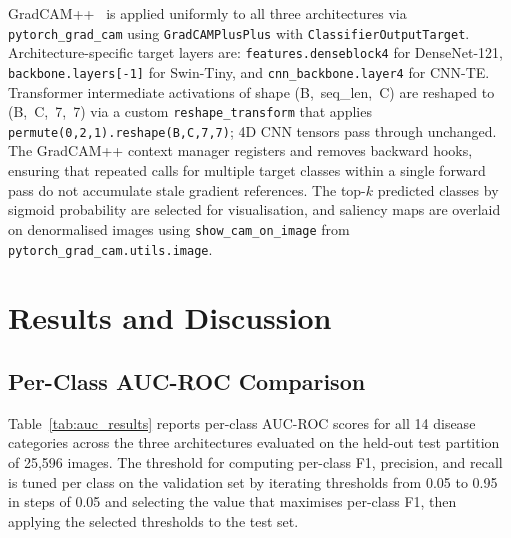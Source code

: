 \documentclass[conference]{IEEEtran}
\begin{document}
GradCAM++~\cite{chattopadhay2018} is applied uniformly to all three
architectures via \texttt{pytorch\_grad\_cam} using
\texttt{GradCAMPlusPlus} with \texttt{ClassifierOutputTarget}.
Architecture-specific target layers are: \texttt{features.denseblock4}
for DenseNet-121, \texttt{backbone.layers[-1]} for Swin-Tiny, and
\texttt{cnn\_backbone.layer4} for CNN-TE. Transformer intermediate
activations of shape (B,~seq\_len,~C) are reshaped to
(B,~C,~7,~7) via a custom \texttt{reshape\_transform} that applies
\texttt{permute(0,2,1).reshape(B,C,7,7)}; 4D CNN tensors pass through
unchanged. The GradCAM++ context manager registers and removes backward
hooks, ensuring that repeated calls for multiple target classes within
a single forward pass do not accumulate stale gradient references. The
top-$k$ predicted classes by sigmoid probability are selected for
visualisation, and saliency maps are overlaid on denormalised images
using \texttt{show\_cam\_on\_image} from \texttt{pytorch\_grad\_cam.utils.image}.
\section{Results and Discussion}

\subsection{Per-Class AUC-ROC Comparison}

Table~\ref{tab:auc_results} reports per-class AUC-ROC scores for all
14 disease categories across the three architectures evaluated on the
held-out test partition of 25,596 images. The threshold for computing
per-class F1, precision, and recall is tuned per class on the
validation set by iterating thresholds from 0.05 to 0.95 in steps of
0.05 and selecting the value that maximises per-class F1, then applying
the selected thresholds to the test set.
\end{document}
